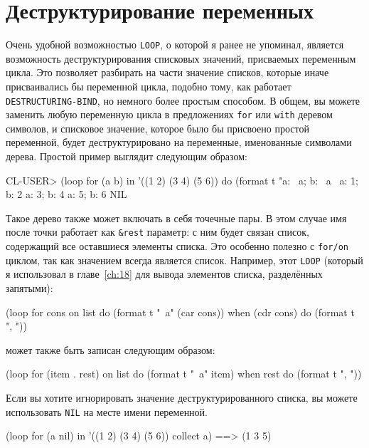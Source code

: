 \section{Деструктурирование переменных}

Очень удобной возможностью \lstinline{LOOP}, о которой я ранее не упоминал, является
возможность деструктурирования списковых значений, присваемых переменным цикла. Это
позволяет разбирать на части значение списков, которые иначе присваивались бы переменной
цикла, подобно тому, как работает \lstinline{DESTRUCTURING-BIND}, но немного более простым
способом. В общем, вы можете заменить любую переменную цикла в предложениях \lstinline{for} или
\lstinline{with} деревом символов, и списковое значение, которое было бы присвоено простой
переменной, будет деструктурировано на переменные, именованные символами дерева. Простой
пример выглядит следующим образом:

\begin{myverb}
CL-USER> (loop for (a b) in '((1 2) (3 4) (5 6))
            do (format t "a: ~a; b: ~a~%
a: 1; b: 2
a: 3; b: 4
a: 5; b: 6
NIL
\end{myverb}

Такое дерево также может включать в себя точечные пары. В этом случае имя после точки
работает как \lstinline!&rest! параметр: с ним будет связан список, содержащий все
оставшиеся элементы списка. Это особенно полезно с \lstinline{for/on} циклом, так как значением
всегда является список. Например, этот \lstinline{LOOP} (который я использовал в
главе~\ref{ch:18} для вывода элементов списка, разделённых запятыми):

\begin{myverb}
(loop for cons on list
    do (format t "~a" (car cons))
    when (cdr cons) do (format t ", "))
\end{myverb}

\noindent{}может также быть записан следующим образом:

\begin{myverb}
(loop for (item . rest) on list
    do (format t "~a" item)
    when rest do (format t ", "))
\end{myverb}

Если вы хотите игнорировать значение деструктурированного списка, вы можете использовать
\lstinline{NIL} на месте имени переменной.

\begin{myverb}
  (loop for (a nil) in '((1 2) (3 4) (5 6)) collect a) ==> (1 3 5)
\end{myverb}

